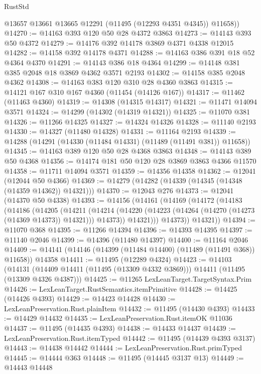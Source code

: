 \begin{lexlean}{RustStd}
\begin{coremodule}
        @13657
        @13661
        @13665
        @12291
        (@11495 (@12293 @4351 @4345))
        @11658))
@14270 := @14163 @393 @120 @50 @28 @4372 @3863
@14273 := @14143 @393 @50 @4372
@14279 := @14176 @392 @14178 @3869 @4371 @4338 @12015
@14282 := @14158 @392 @14178 @4371
@14288 := @14163 @386 @391 @18 @52 @4364 @4370
@14291 := @14143 @386 @18 @4364
@14299 := @14148 @381 @385 @2048 @18 @3869 @4362 @3571 @2193
@14302 := @14158 @385 @2048 @4362
@14308 := @14163 @383 @120 @310 @28 @4360 @3863
@14315 := @14121 @167 @310 @167 @4360 (@11454 (@14126 @167))
@14317 := @11462 (@11463 @4360)
@14319 := @14308 (@14315 @14317)
@14321 := @11471 @14094 @3571
@14324 := @14299 (@14302 (@14319 @14321))
@14325 := @11070 @381
@14326 := @11266 @14325
@14327 := @14324 @14326
@14328 := @11140 @2193
@14330 := @14327 (@11480 @14328)
@14331 := @11164 @2193
@14339 := @14288 (@14291 (@14330 (@11484 @14331) (@11489 (@11491 @381)) @11658))
@14345 := @14163 @389 @120 @50 @28 @4368 @3863
@14348 := @14143 @389 @50 @4368
@14356 := @14174 @181 @50 @120 @28 @3869 @3863 @4366 @11570
@14358 := @11711 @14094 @3571
@14359 := @14356 @14358
@14362 := @12041 (@12044 @50 @4366)
@14369 := @14279 (@14282 (@14339 (@14345 (@14348 (@14359 @14362)) @14321)))
@14370 := @12043 @276
@14373 := @12041 (@14370 @50 @4338)
@14393 := @14156
    (@14161
      (@14169
        (@14172
          (@14183
            (@14186
              (@14205
                (@14211
                  (@14214
                    (@14220 (@14223 (@14264 (@14270 (@14273 (@14369 @14373)) @14321))) @14373))
                  @14321)))
            @14373))
        @14321))
@14394 := @11070 @368
@14395 := @11266 @14394
@14396 := @14393 @14395
@14397 := @11140 @2046
@14399 := @14396 (@11480 @14397)
@14400 := @11164 @2046
@14409 := @14141 (@14146 (@14399 (@11484 @14400) (@11489 (@11491 @368)) @11658)) @14358
@14411 := @11495 (@12289 @4324)
@14423 := @14103
    (@14131 (@14409 @14411 (@11495 (@13309 @4332 @3869))) @14411 (@11495 (@13309 @4326 @4387)))
@14425 := @11265 LexLeanTarget.TargetSyntax.Prim
@14426 := LexLeanTarget.RustSemantics.itemPrimitive
@14428 := @14425 (@14426 @4393)
@14429 := @14423 @14428
@14430 := LexLeanPreservation.Rust.plainItem
@14432 := @11495 (@14430 @4393)
@14433 := @14429 @14432
@14435 := LexLeanPreservation.Rust.itemOK @11036
@14437 := @11495 (@14435 @4393)
@14438 := @14433 @14437
@14439 := LexLeanPreservation.Rust.itemTyped
@14442 := @11495 (@14439 @4393 @3137)
@14443 := @14438 @14442
@14444 := LexLeanPreservation.Rust.primTyped
@14445 := @14444 @363
@14448 := @11495 (@14445 @3137 @13)
@14449 := @14443 @14448

\end{coremodule}
\end{lexlean}
